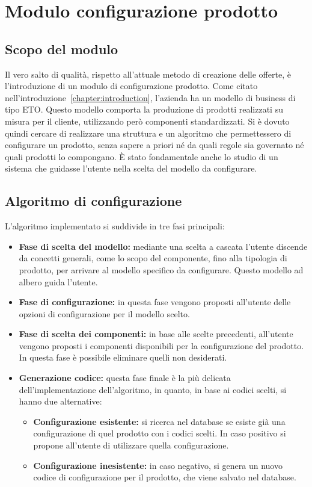 \chapter{Modulo configurazione prodotto}\label{chapter:Configurazione}
\section{Scopo del modulo}
Il vero salto di qualità, rispetto all'attuale metodo di creazione delle offerte,
è l'introduzione di un modulo di configurazione prodotto.
Come citato nell'introduzione~\ref{chapter:introduction}, l'azienda ha un modello di business
di tipo \ac{ETO}. Questo modello comporta la produzione di prodotti realizzati
su misura per il cliente, utilizzando però componenti standardizzati.
Si è dovuto quindi cercare di realizzare una struttura e un algoritmo che permettessero
di configurare un prodotto, senza sapere a priori né da quali regole sia governato né quali prodotti lo compongano.
È stato fondamentale anche lo studio di un sistema che guidasse l'utente nella scelta del modello da configurare.
\section{Algoritmo di configurazione}
L'algoritmo implementato si suddivide in tre fasi principali:
\begin{itemize}
    \item \textbf{Fase di scelta del modello:} mediante una scelta
    a cascata l'utente discende da concetti generali, come lo scopo del componente, fino alla tipologia di prodotto,
     per arrivare al modello specifico da configurare.
     Questo modello ad albero guida l'utente.
    \item \textbf{Fase di configurazione:} in questa fase vengono proposti all'utente delle
    opzioni di configurazione per il modello scelto.
    \item \textbf{Fase di scelta dei componenti:} in base alle scelte precedenti,
    all'utente vengono proposti i componenti disponibili per la configurazione del prodotto.
    In questa fase è possibile eliminare quelli non desiderati.
    \item \textbf{Generazione codice:} questa fase 
    finale è la più delicata dell'implementazione dell'algoritmo, in quanto, in base ai codici scelti, si hanno
    due alternative:
    \begin{itemize}
        \item \textbf{Configurazione esistente:} si ricerca nel database se esiste già una configurazione
        di quel prodotto con i codici scelti.
         In caso positivo si propone all'utente di utilizzare quella configurazione.
        \item \textbf{Configurazione inesistente:} in caso negativo, 
        si genera un nuovo codice di configurazione per il prodotto, che viene salvato nel database.
    \end{itemize}
\end{itemize}
